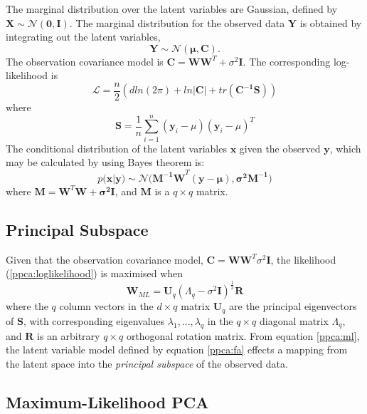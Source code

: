 \documentclass[ %
                    author={Dillon Keith Diep},
                supervisor={Dr. Carl Henrik Ek},
                    degree={MEng},
                     title={Assisted Content Generation for 3D Hair Geometry},
                  subtitle={[INCOMPLETE DRAFT, CONTAINS NOTES FROM RESEARCH]},
                      type={Research},
                      year={2014} ]{dissertation}
\begin{document}
The marginal distribution over the latent variables are Gaussian, defined by $\mathbf{X\sim\mathcal{N}(0,I)}$. The marginal distribution for the observed data $\mathbf{Y}$ is obtained by integrating out the latent variables,
$$\mathbf{Y}\sim\mathcal{N}\mathbf{(\mu,C)}.$$
The observation covariance model is $\mathbf{C=WW}^T+\sigma^2\mathbf{I}$. The corresponding log-likelihood is
\begin{equation} \label{ppca:loglikelihood}
	\mathcal{L}=\frac{n}{2}(d ln(2\pi)+ln|\mathbf{C}|+tr(\mathbf{C^{-1}S}))
\end{equation}
where
$$\mathbf{S}=\frac{1}{n}\sum^n_{i=1}(\mathbf{y}_i-\mu)(\mathbf{y}_i-\mu)^T$$
The conditional distribution of the latent variables $\mathbf{x}$ given the observed $\mathbf{y}$, which may be calculated by using Bayes theorem is:
$$p(\mathbf{x|y)\sim\mathcal{N}(M^{-1}W}^T\mathbf{(y-\mu),\sigma^2M^{-1})}$$
where $\mathbf{M=W}^T\mathbf{W+\sigma^2I}$, and $\mathbf{M}$ is a $q \times q$ matrix.

\subsection{Principal Subspace}
Given that the observation covariance model, $\mathbf{C}=\mathbf{WW}^T\sigma^2\mathbf{I}$, the likelihood (\ref{ppca:loglikelihood}) is maximised when
\begin{equation} \label{ppca:ml}
	\mathbf{W}_{ML}=\mathbf{U}_q(\Lambda_q-\sigma^2\mathbf{I})^{\frac{1}{2}}\mathbf{R}
\end{equation}
where the $q$ column vectors in the $d \times q$ matrix $\mathbf{U}_q$ are the principal eigenvectors of $\mathbf{S}$, with corresponding eigenvalues $\lambda_1,...,\lambda_q$ in the $q \times q$ diagonal matrix $\Lambda_q$, and $\mathbf{R}$ is an arbitrary $q \times q$ orthogonal rotation matrix. From equation \ref{ppca:ml}, the latent variable model defined by equation \ref{ppca:fa} effects a mapping from the latent space into the \textit{principal subspace} of the observed data.

\subsection{Maximum-Likelihood PCA}
\end{document}
